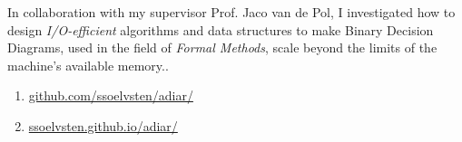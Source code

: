 
In collaboration with my supervisor Prof. Jaco van de Pol, I investigated how to design
\emph{I/O-efficient} algorithms and data structures to make Binary Decision Diagrams, used in the
field of \emph{Formal Methods}, scale beyond the limits of the machine's available memory..

\medskip

\begin{enumerate}[leftmargin=2.5em]
\item[\indent\faGit] \href{https://github.com/ssoelvsten/adiar/}{github.com/ssoelvsten/adiar/}

\item[\indent\faFileTextO] \href{https://ssoelvsten.github.io/adiar/}{ssoelvsten.github.io/adiar/}
\end{enumerate}

\medskip
